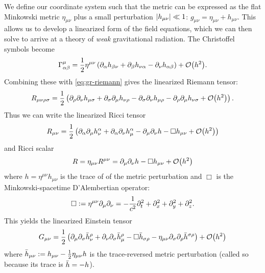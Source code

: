 We define our coordinate system such that the metric can be expressed as the flat Minkowski metric $\eta_{\mu\nu}$ plus a small perturbation $\abs{h_{\mu\nu}} \ll 1$: $g_{\mu \nu} = \eta_{\mu \nu} + h_{\mu \nu}$.
This allows us to develop a linearized form of the field equations, which we can then solve to arrive at a theory of \textit{weak} gravitational radiation.
The Christoffel symbols become
\begin{equation}\label{eq:gr-christoffel-lin}
	\Gamma_{\alpha \beta}^{\mu} = \frac{1}{2} \eta^{\mu\nu} \left( \partial_{\alpha} h_{\beta\nu} + \partial_{\beta} h_{\nu\alpha} - \partial_{\nu} h_{\alpha\beta} \right) + \order{h^2}.
\end{equation}
Combining these with \cref{eq:gr-riemann} gives the linearized Riemann tensor:
\begin{equation}\label{eq:gr-riemann-lin}
	R_{\mu\nu\rho\sigma} = \frac{1}{2} \left(
		\partial_{\rho} \partial_{\nu} h_{\mu \sigma}
		+ \partial_{\sigma} \partial_{\mu} h_{\nu \rho}
		- \partial_{\sigma} \partial_{\nu} h_{\mu \rho}
		- \partial_{\rho} \partial_{\mu} h_{\nu \sigma}
		+ \order{h^2}
	\right).
\end{equation}
Thus we can write the linearized Ricci tensor
\begin{equation}\label{eq:gr-ricci-tensor-lin}
	R_{\mu\nu} = \frac{1}{2} \left(
		\partial_{\alpha} \partial_{\mu} h_{\nu}^{\alpha}
		+ \partial_{\alpha} \partial_{\nu} h_{\mu}^{\alpha}
		- \partial_{\mu} \partial_{\nu} h
		- \Box h_{\mu\nu}
		+ \order{h^2}
	\right)
\end{equation}
and Ricci scalar
\begin{equation}\label{eq:gr-ricci-scalar-lin}
	R = \eta_{\mu\nu}R^{\mu\nu} = \partial_{\mu}\partial_{\nu}h - \Box h_{\mu\nu} + \order{h^2}
\end{equation}
where $h = \eta^{\mu\nu}h_{\mu\nu}$ is the trace of of the metric perturbation and $\Box$ is the Minkowski-spacetime D'Alembertian operator:
\begin{equation}
	\Box \vcentcolon= \eta^{\mu\nu} \partial_{\mu} \partial_{\nu} = -\frac{1}{c^2} \partial_t^2 + \partial_x^2 + \partial_y^2 + \partial_z^2.
\end{equation}
This yields the linearized Einstein tensor
\begin{equation}\label{eq:gr-einstein-lin}
	G_{\mu\nu} =
		\frac{1}{2} \left( \partial_{\mu}\partial_{\sigma}\Bar{h}_{\nu}^{\rho}
		+ \partial_{\nu}\partial_{\sigma}\Bar{h}_{\mu}^{\rho}
		- \Box \Bar{h}_{\sigma \rho}
		- \eta_{\mu\nu}\partial_{\sigma}\partial_{\rho}\Bar{h}^{\sigma\rho} \right)
		+ \order{h^2}
\end{equation}
where $\Bar{h}_{\mu\nu} := h_{\mu\nu} - \frac{1}{2}\eta_{\mu\nu}h$ is the trace-reversed metric perturbation (called so because its trace is $\Bar{h} = -h$).

